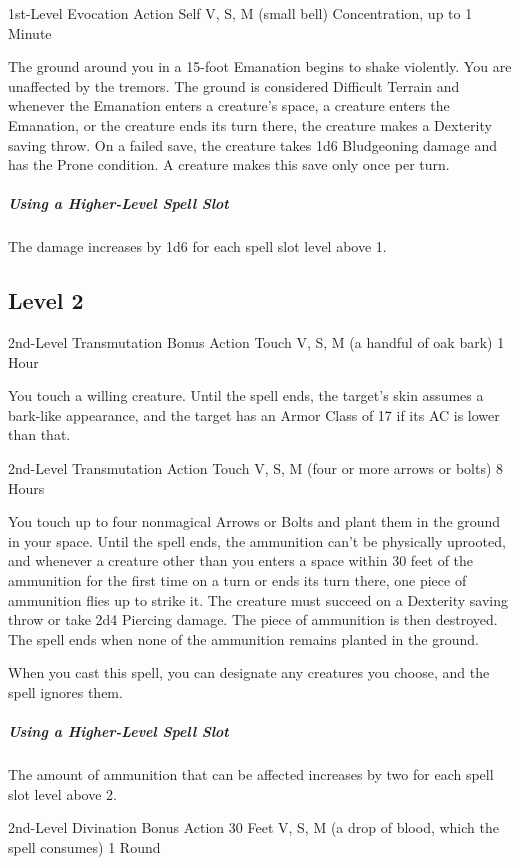 \documentclass[letterpaper,openany,oneside,twocolumn]{book}
\begin{document}
	{1st-Level Evocation}
	{Action}
	{Self}
	{V, S, M (small bell)}
	{Concentration, up to 1 Minute}

The ground around you in a 15-foot Emanation begins to shake violently. You are unaffected by the tremors. The ground is considered Difficult Terrain and whenever the Emanation enters a creature's space, a creature enters the Emanation, or the creature ends its turn there, the creature makes a Dexterity saving throw. On a failed save, the creature takes 1d6 Bludgeoning damage and has the Prone condition. A creature makes this save only once per turn.

\subparagraph*{Using a Higher-Level Spell Slot} The damage increases by 1d6 for each spell slot level above 1.

\subsection*{Level 2}
	{2nd-Level Transmutation}
	{Bonus Action}
	{Touch}
	{V, S, M (a handful of oak bark)}
	{1 Hour}

You touch a willing creature. Until the spell ends, the target's skin assumes a bark-like appearance, and the target has an Armor Class of 17 if its AC is lower than that.

	{2nd-Level Transmutation}
	{Action}
	{Touch}
	{V, S, M (four or more arrows or bolts)}
	{8 Hours}

You touch up to four nonmagical Arrows or Bolts and plant them in the ground in your space. Until the spell ends, the ammunition can't be physically uprooted, and whenever a creature other than you enters a space within 30 feet of the ammunition for the first time on a turn or ends its turn there, one piece of ammunition flies up to strike it. The creature must succeed on a Dexterity saving throw or take 2d4 Piercing damage. The piece of ammunition is then destroyed. The spell ends when none of the ammunition remains planted in the ground.

When you cast this spell, you can designate any creatures you choose, and the spell ignores them.

\subparagraph*{Using a Higher-Level Spell Slot} The amount of ammunition that can be affected increases by two for each spell slot level above 2.

	{2nd-Level Divination}
	{Bonus Action}
	{30 Feet}
	{V, S, M (a drop of blood, which the spell consumes)}
	{1 Round}
\end{document}

